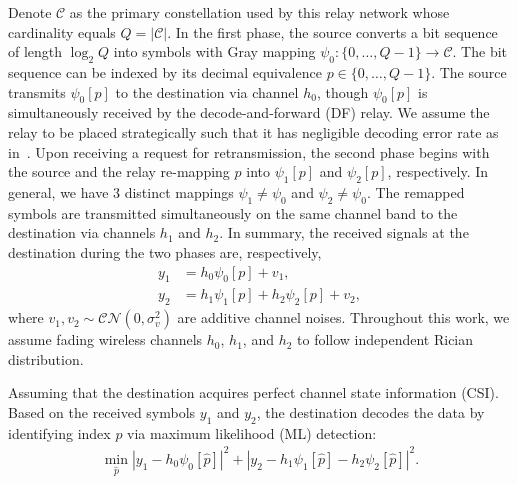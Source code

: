 \documentclass[journal,draftcls,onecolumn,12pt,twoside]{IEEEtran}
\begin{document}
Denote $\mathcal{C}$ as the primary constellation used by this relay
network whose cardinality equals $Q = |\mathcal{C}|$. In the first phase, the
source converts a bit sequence of length $\log_2Q$ into symbols with Gray mapping $\psi_0:
\{0,\ldots,Q - 1\}\rightarrow \mathcal{C}$. The bit sequence can be indexed by
its decimal equivalence $p\in \{0,\ldots,Q - 1\}$. The source transmits
$\psi_0[p]$ to the destination via channel $h_0$, though $\psi_0[p]$ is
simultaneously received by the decode-and-forward (DF) relay. We assume the
relay to be placed strategically such that it has negligible decoding error rate
as in~\cite{ryu2011ber, kim2009design}. Upon receiving a request for
retransmission, the second phase begins with the source and the relay re-mapping
$p$ into $\psi_1[p]$ and $\psi_2[p]$, respectively. In general, we have 3
distinct mappings $\psi_1\not=\psi_0$ and $\psi_2\not=\psi_0$. The remapped
symbols are transmitted simultaneously on the same channel band to the
destination via channels $h_1$ and $h_2$. In summary, the received signals at
the destination during the two phases are, respectively,
\begin{subequations}
    \begin{align}
       y_1 & = h_0\psi_0[p] + v_1, \\
       y_2 & = h_1\psi_1[p] + h_2\psi_2[p] + v_2,
    \end{align}
\end{subequations}
where $v_1, v_2\sim\mathcal{CN}(0,\sigma_v^2)$ are additive channel noises.
Throughout this work, we assume fading wireless channels $h_0$, $h_1$, and $h_2$ 
to follow independent Rician distribution.

Assuming that the destination acquires perfect channel state information (CSI).
Based on the received symbols $y_1$ and $y_2$,  the destination decodes the data
by identifying index $p$ via maximum likelihood (ML) detection:
\begin{align}
    \min_{\hat{p}} |y_1 - h_0\psi_0[\hat{p}]|^2 + |y_2-
    h_1\psi_1[\hat{p}] - h_2\psi_2[\hat{p}]|^2.
    \label{eq:ML}
\end{align}

%
%
\end{document}
